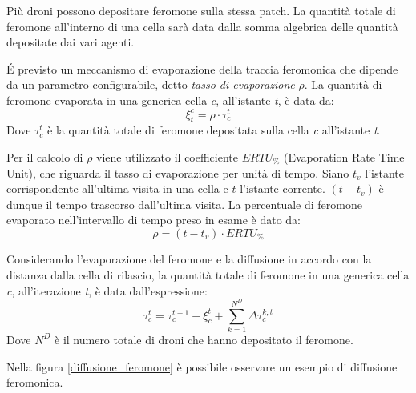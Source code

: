 Più droni possono depositare feromone sulla stessa patch.
La quantità totale di feromone all'interno di una cella sarà data dalla somma algebrica delle quantità depositate dai vari agenti.

\'E previsto un meccanismo di evaporazione della traccia feromonica che dipende da un parametro configurabile, detto \textit{tasso di evaporazione} $\rho$.
La quantità di feromone evaporata in una generica cella \textit{c}, all'istante \textit{t}, è data da:
\begin{equation}
    \xi_{t}^{c} = \rho \cdot \tau_{c}^{t}
\end{equation}
Dove $\tau_{c}^{t}$ è la quantità totale di feromone depositata sulla cella \textit{c} all'istante \textit{t}.

Per il calcolo di $\rho$ viene utilizzato il coefficiente $ERTU_{\%}$ (Evaporation Rate Time Unit), che riguarda il tasso di evaporazione per unità di tempo.
Siano $t_{v}$ l'istante corrispondente all'ultima visita in una cella e $t$ l'istante corrente.
$(t - t_{v})$ è dunque il tempo trascorso dall'ultima visita. 
La percentuale di feromone evaporato nell'intervallo di tempo preso in esame è dato da:
\begin{equation}
    \rho = (t - t_{v}) \cdot ERTU_{\%}
\end{equation}

Considerando l'evaporazione del feromone e la diffusione in accordo con la distanza dalla cella di rilascio, la quantità totale di feromone in una generica cella \textit{c}, all'iterazione \textit{t}, è data dall'espressione:
\begin{equation}\label{rule18}
    \tau_{c}^{t} = \tau_{c}^{t-1} - \xi_{c}^{t} + \sum_{k=1}^{N^{D}} \Delta\tau_{c}^{k,t}
\end{equation}
Dove $N^{D}$ è il numero totale di droni che hanno depositato il feromone.

Nella figura \ref{diffusione_feromone} è possibile osservare un esempio di diffusione feromonica.

